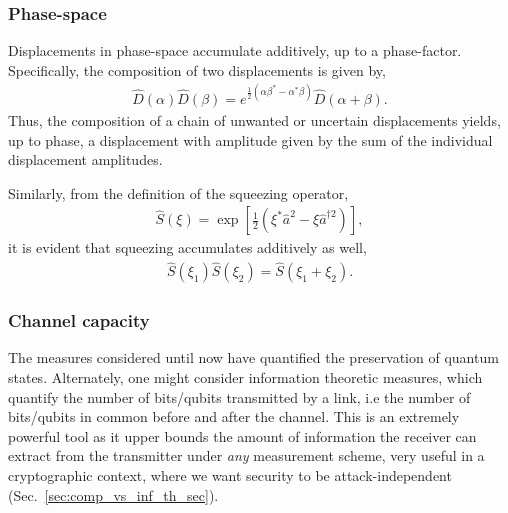 %
%

\subsubsection{Phase-space} 

Displacements in phase-space accumulate additively, up to a phase-factor. Specifically, the composition of two displacements is given by,
\begin{align}
\hat{D}(\alpha)\hat{D}(\beta) = e^{\frac{1}{2}(\alpha\beta^*-\alpha^*\beta)}\hat{D}(\alpha+\beta).
\end{align}
Thus, the composition of a chain of unwanted or uncertain displacements yields, up to phase, a displacement with amplitude given by the sum of the individual displacement amplitudes.

Similarly, from the definition of the squeezing operator,
\begin{align}\label{eq:sq_op}
\hat{S}(\xi) = \exp\left[ \frac{1}{2}(\xi^*\hat{a}^2 - \xi{\hat{a}^{\dag 2}})\right],
\end{align}
it is evident that squeezing accumulates additively as well,
\begin{align}
\hat{S}(\xi_1)\hat{S}(\xi_2) = \hat{S}(
\xi_1+\xi_2).	
\end{align}

%
%

\subsubsection{Channel capacity} \label{sec:channel_cap} 

The measures considered until now have quantified the preservation of quantum states. Alternately, one might consider information theoretic measures, which quantify the number of bits/qubits transmitted by a link, i.e the number of bits/qubits in common before and after the channel. This is an extremely powerful tool as it upper bounds the amount of information the receiver can extract from the transmitter under \textit{any} measurement scheme, very useful in a cryptographic context, where we want security to be attack-independent (Sec.~\ref{sec:comp_vs_inf_th_sec}). 




